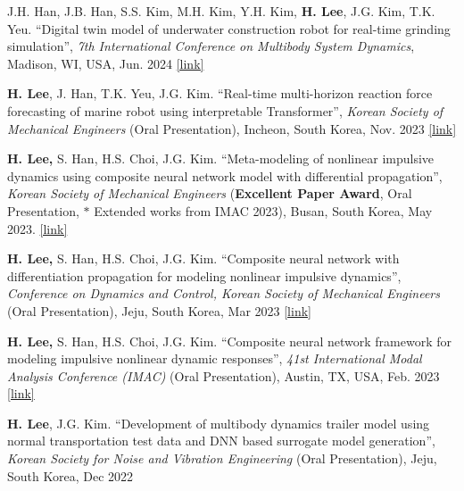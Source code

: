\documentclass{article}
\begin{document}
\vspace*{1cm}
\begin{etaremune}[itemsep=0.2cm]
    \Large
    \item J.H. Han, J.B. Han, S.S. Kim, M.H. Kim, Y.H. Kim, \textbf{H. Lee}, J.G. Kim, T.K. Yeu. “Digital twin model of underwater construction robot for real-time grinding simulation”, \textit{7th International Conference on Multibody System Dynamics}, Madison, WI, USA, Jun. 2024 \href{https://easychair.org/publications/preprint/WkF3}{[link]}
	\item \textbf{H. Lee}, J. Han, T.K. Yeu, J.G. Kim. “Real-time multi-horizon reaction force forecasting of marine robot using interpretable Transformer”, \textit{Korean Society of Mechanical Engineers} (Oral Presentation), Incheon, South Korea, Nov. 2023  \href{https://www.dbpia.co.kr/Journal/articleDetail?nodeId=NODE11709087}{[link]}
	\item \textbf{H. Lee,} S. Han, H.S. Choi, J.G. Kim. “Meta-modeling of nonlinear impulsive dynamics using composite neural network model with differential propagation”, \textit{Korean Society of Mechanical Engineers} (\textbf{Excellent Paper Award}, Oral Presentation, $*$ Extended works from IMAC 2023), Busan, South Korea, May 2023. \href{https://www.dbpia.co.kr/journal/articleDetail?nodeId=NODE11511050}{[link]}
	\item \textbf{H. Lee,} S. Han, H.S. Choi, J.G. Kim. “Composite neural network with differentiation propagation for modeling nonlinear impulsive dynamics”, \textit{Conference on Dynamics and Control, Korean Society of Mechanical Engineers} (Oral Presentation), Jeju, South Korea, Mar 2023 \href{https://www.dbpia.co.kr/Journal/articleDetail?nodeId=NODE11527668}{[link]}
	\item \textbf{H. Lee,} S. Han, H.S. Choi, J.G. Kim. “Composite neural network framework for modeling impulsive nonlinear dynamic responses”, \textit{41st International Modal Analysis Conference (IMAC)} (Oral Presentation), Austin, TX, USA, Feb. 2023 \href{https://link.springer.com/chapter/10.1007/978-3-031-34946-1_21}{[link]}
	\item \textbf{H. Lee}, J.G. Kim. “Development of multibody dynamics trailer model using normal transportation test data and DNN based surrogate model generation”, \textit{Korean Society for Noise and Vibration Engineering} (Oral Presentation), Jeju, South Korea, Dec 2022
\end{etaremune}
\end{document}
